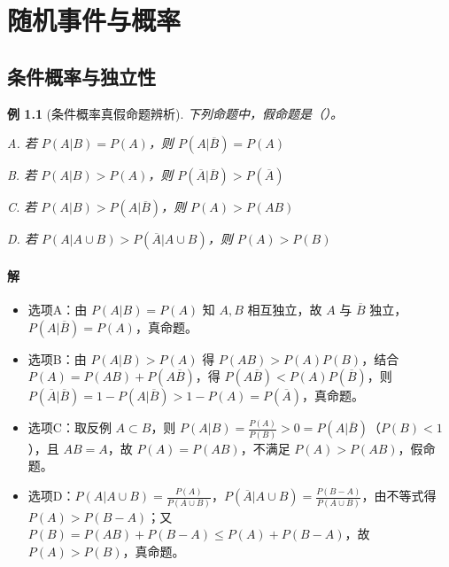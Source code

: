\documentclass[11pt,a4paper,oneside,openany]{book}
\theoremstyle{yhbthm}
\newtheorem{example}{例}[section]
\newcommand{\makeCover}{}
\begin{document}
\makeCover
\thispagestyle{empty}
\newpage

\pagestyle{plain}
\tableofcontents
\newpage

\pagestyle{fancy}
\setcounter{page}{1}

\chapter{随机事件与概率}
\section{条件概率与独立性}

\begin{example}[条件概率真假命题辨析]
下列命题中，假命题是（）。

A. 若 $P(A|B) = P(A)$，则 $P(A|\overline{B}) = P(A)$

B. 若 $P(A|B) > P(A)$，则 $P(\overline{A}|\overline{B}) > P(\overline{A})$

C. 若 $P(A|B) > P(A|\overline{B})$，则 $P(A) > P(AB)$

D. 若 $P(A|A \cup B) > P(\overline{A}|A \cup B)$，则 $P(A) > P(B)$
\end{example}

\subsubsection{解}
\begin{itemize}
  \item 选项A：由 $P(A|B) = P(A)$ 知 $A,B$ 相互独立，故 $A$ 与 $\overline{B}$ 独立，$P(A|\overline{B}) = P(A)$，真命题。
  \item 选项B：由 $P(A|B) > P(A)$ 得 $P(AB) > P(A)P(B)$，结合 $P(A) = P(AB) + P(A\overline{B})$，得 $P(A\overline{B}) < P(A)P(\overline{B})$，则 $P(\overline{A}|\overline{B}) = 1 - P(A|\overline{B}) > 1 - P(A) = P(\overline{A})$，真命题。
  \item 选项C：取反例 $A \subset B$，则 $P(A|B) = \frac{P(A)}{P(B)} > 0 = P(A|\overline{B})$（$P(B) < 1$），且 $AB = A$，故 $P(A) = P(AB)$，不满足 $P(A) > P(AB)$，假命题。
  \item 选项D：$P(A|A \cup B) = \frac{P(A)}{P(A \cup B)}$，$P(\overline{A}|A \cup B) = \frac{P(B - A)}{P(A \cup B)}$，由不等式得 $P(A) > P(B - A)$；又 $P(B) = P(AB) + P(B - A) \le P(A) + P(B - A)$，故 $P(A) > P(B)$，真命题。
\end{itemize}
\end{document}
